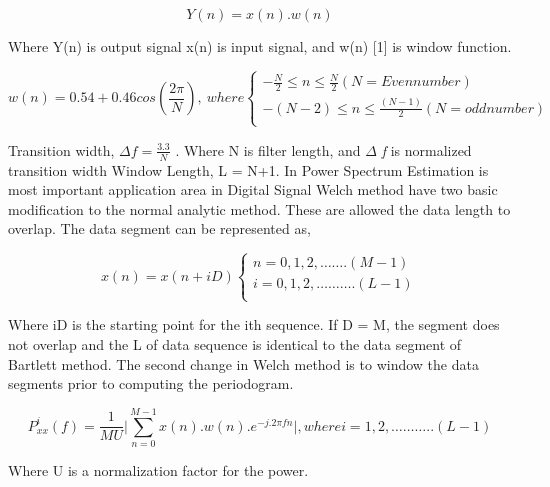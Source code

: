\begin{equation}\tag{20}
Y \left( n \right) =x \left( n \right) .w \left( n \right)
\end{equation}
\begin{justify}
Where Y(n) is output signal x(n) is input signal, and w(n) [1] is window function.
\end{justify}\par


\begin{equation}\tag{29}
w \left( n \right) =0.54+0.46cos \left( \frac{2 \pi }{N} \right) ,~ where \left\{ \begin{array}{ll}
	-\frac{N}{2} \leq n \leq \frac{N}{2}  \left( N=Even number \right) \\
	- \left( N-2 \right)  \leq n \leq \frac{ \left( N-1 \right) }{2} \left( N=odd number \right) \\
	\end{array}
\end{equation}
\begin{justify}
Transition width,  \(  \Delta f=\frac{3.3}{N} \) . Where N is filter length, and $ \Delta $ \textit{f} is normalized transition width Window Length, L = N+1. In Power Spectrum Estimation is most important application area in Digital Signal Welch method have two basic modification to the normal analytic method. These are allowed the data length to overlap. The data segment can be represented as,
\end{justify}\par


\begin{equation}\tag{21}
x \left( n \right) =x \left( n+iD \right)  \left\{ \begin{array}{ll}
	n=0,1,2, \ldots  \ldots . \left( M-1 \right) \\
	i=0,1,2, \ldots  \ldots  \ldots . \left( L-1 \right) \\
	\end{array}
\end{equation}
\begin{justify}
Where iD is the starting point for the ith sequence. If D = M, the segment does not overlap and the L of data sequence is identical to the data segment of Bartlett method. The second change in Welch method is to window the data segments prior to computing the periodogram.
\end{justify}\par


\begin{equation}\tag{22}
P_{xx}^{i} \left( f \right) =\frac{1}{MU} \vert  \sum _{n=0}^{M-1}x \left( n \right) .w \left( n \right) .e^{-j.2 \pi fn} \vert , where i=1,2, \ldots  \ldots  \ldots .. \left( L-1 \right)
\end{equation}
\begin{justify}
Where U is a normalization factor for the power.
\end{justify}\par


